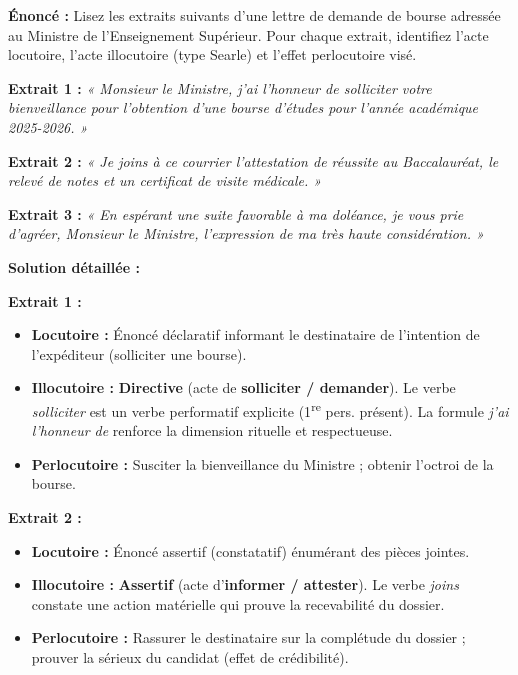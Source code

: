 \documentclass[11pt]{article}
\begin{document}
\begin{exoresolu}
\textbf{Énoncé :} Lisez les extraits suivants d'une lettre de demande de bourse adressée au Ministre de l'Enseignement Supérieur. Pour chaque extrait, identifiez l'acte locutoire, l'acte illocutoire (type Searle) et l'effet perlocutoire visé.

\textbf{Extrait 1 :} \emph{« Monsieur le Ministre, j'ai l'honneur de solliciter votre bienveillance pour l'obtention d'une bourse d'études pour l'année académique 2025-2026. »}

\textbf{Extrait 2 :} \emph{« Je joins à ce courrier l'attestation de réussite au Baccalauréat, le relevé de notes et un certificat de visite médicale. »}

\textbf{Extrait 3 :} \emph{« En espérant une suite favorable à ma doléance, je vous prie d'agréer, Monsieur le Ministre, l'expression de ma très haute considération. »}

\tcblower
\textbf{Solution détaillée :}

\textbf{Extrait 1 :}
\begin{itemize}
    \item \textbf{Locutoire :} Énoncé déclaratif informant le destinataire de l'intention de l'expéditeur (solliciter une bourse).
    \item \textbf{Illocutoire :} \textbf{Directive} (acte de \textbf{solliciter / demander}). Le verbe \emph{solliciter} est un verbe performatif explicite (1\textsuperscript{re} pers. présent). La formule \emph{j'ai l'honneur de} renforce la dimension rituelle et respectueuse.
    \item \textbf{Perlocutoire :} Susciter la bienveillance du Ministre ; obtenir l'octroi de la bourse.
\end{itemize}

\textbf{Extrait 2 :}
\begin{itemize}
    \item \textbf{Locutoire :} Énoncé assertif (constatatif) énumérant des pièces jointes.
    \item \textbf{Illocutoire :} \textbf{Assertif} (acte d'\textbf{informer / attester}). Le verbe \emph{joins} constate une action matérielle qui prouve la recevabilité du dossier.
    \item \textbf{Perlocutoire :} Rassurer le destinataire sur la complétude du dossier ; prouver la sérieux du candidat (effet de crédibilité).
\end{itemize}


\end{exoresolu}
\end{document}

